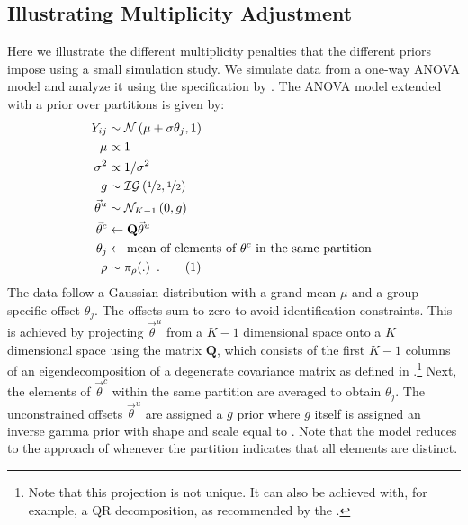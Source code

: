 \documentclass[11pt,a4paper]{article}
\theoremstyle{definition} %
\theoremstyle{case}
\newcommand{\numberthis}{\addtocounter{equation}{1}\tag{\theequation}}
\newcommand{\FD}[1]{\textcolor{red}{Fabian: #1 }}
\begin{document}
\subsection{Illustrating Multiplicity Adjustment} \label{sec:illustration}
Here we illustrate the different multiplicity penalties that the different priors impose using a small simulation study. We simulate data from a one-way ANOVA model and analyze it using the specification by \textcite{rouder2012default}. The ANOVA model extended with a prior over partitions is given by:
\begin{align*}
    Y_{ij}              &\sim \mathcal{N}\left(\mu + \sigma\theta_j, 1\right)\\
    \mu                 &\propto 1  \\
    \sigma^2            &\propto 1 / \sigma^2 \\
    g                   &\sim \mathcal{IG}\left(\nicefrac{1}{2}, \nicefrac{1}{2}\right) \\
    \vec{\theta}^u   &\sim \mathcal{N}_{K-1}\left(0, g\right)   \\
    \vec{\theta}^c   &\leftarrow \mathbf{Q}\vec{\theta}^u \\
    \theta_j            &\leftarrow \text{mean of elements of } \theta^c \text{ in the same partition }\\
    \rho                &\sim \pi_{\rho}(.) \enspace . \numberthis
\end{align*}
The data follow a Gaussian distribution with a grand mean $\mu$ and a group-specific offset $\theta_j$. The offsets sum to zero to avoid identification constraints. This is achieved by projecting $\vec{\theta}^u$ from a $K-1$ dimensional space onto a $K$ dimensional space using the matrix $\mathbf{Q}$, which consists of the first $K-1$ columns of an eigendecomposition of a degenerate covariance matrix as defined in \textcite{rouder2012default}.\footnote{Note that this projection is not unique. It can also be achieved with, for example, a QR decomposition, as recommended by the \textcite{stanUserManual}.} Next, the elements of $\vec{\theta}^c$ within the same partition are averaged to obtain $\theta_j$. The unconstrained offsets $\vec{\theta}^u$ are assigned a $g$ prior where $g$ itself is assigned an inverse gamma prior with shape and scale equal to  \parencite{liang2008mixtures}. Note that the model reduces to the approach of \textcite{rouder2012default} whenever the partition indicates that all elements are distinct.

\end{document}
